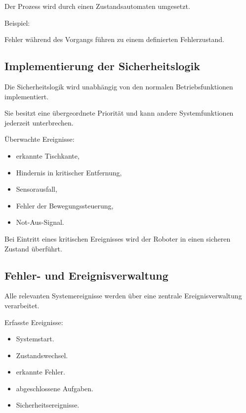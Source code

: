 Der Prozess wird durch einen Zustandsautomaten umgesetzt.

Beispiel:

\begin{Shaded}
\begin{Highlighting}[]
\end{Highlighting}
\end{Shaded}

Fehler während des Vorgangs führen zu einem definierten Fehlerzustand.

\subsection{Implementierung der
Sicherheitslogik}\label{implementierung-der-sicherheitslogik}

Die Sicherheitslogik wird unabhängig von den normalen Betriebsfunktionen
implementiert.

Sie besitzt eine übergeordnete Priorität und kann andere
Systemfunktionen jederzeit unterbrechen.

Überwachte Ereignisse:

\begin{itemize}
\tightlist
\item
  erkannte Tischkante,
\item
  Hindernis in kritischer Entfernung,
\item
  Sensorausfall,
\item
  Fehler der Bewegungssteuerung,
\item
  Not-Aus-Signal.
\end{itemize}

Bei Eintritt eines kritischen Ereignisses wird der Roboter in einen
sicheren Zustand überführt.

\subsection{Fehler- und
Ereignisverwaltung}\label{fehler--und-ereignisverwaltung}

Alle relevanten Systemereignisse werden über eine zentrale
Ereignisverwaltung verarbeitet.

Erfasste Ereignisse:

\begin{itemize}
\tightlist
\item
  Systemstart.
\item
  Zustandswechsel.
\item
  erkannte Fehler.
\item
  abgeschlossene Aufgaben.
\item
  Sicherheitsereignisse.
\end{itemize}

